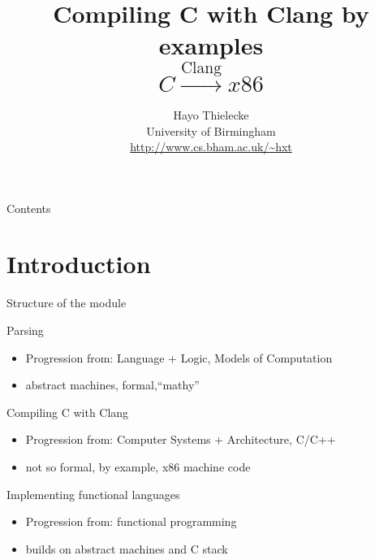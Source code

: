 \documentclass[landscape]{beamer}
\title{Compiling C with Clang by examples
\\[1em]
\(
 C \stackrel{\mbox{Clang}}{\longrightarrow} x86
 \)
 }
\author{Hayo Thielecke
\\
University of Birmingham
\\
\url{http://www.cs.bham.ac.uk/~hxt}
}
\begin{document}
\begin{frame}{}
\maketitle
\end{frame}

\begin{frame}{Contents}
\tableofcontents
\end{frame}

\section{Introduction}

\begin{frame}{Structure of the module}

\begin{block}{Parsing \checkmark}
\begin{itemize}
\item Progression from: Language + Logic, Models of Computation
\item abstract machines, formal,``mathy''
\end{itemize}
\end{block}

\begin{block}{Compiling C with Clang}
\begin{itemize}
\item Progression from: Computer Systems + Architecture, C/C++
\item not so formal, by example, x86 machine code
\end{itemize}
\end{block}

\begin{block}{Implementing functional languages}
\begin{itemize}
\item Progression from: functional programming
\item builds on abstract machines and C stack
\end{itemize}
\end{block}

\end{frame}
\end{document}
